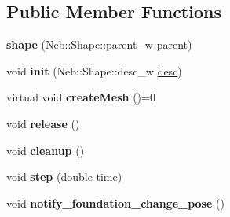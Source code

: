\subsection*{\-Public \-Member \-Functions}
\begin{DoxyCompactItemize}
\item 
\hypertarget{classNeb_1_1Shape_1_1shape_ad2547b328a70cdf62f5ad2b0331ccb1a}{{\bfseries shape} (\-Neb\-::\-Shape\-::parent\-\_\-w \hyperlink{classNeb_1_1Shape_1_1parent}{parent})}\label{classNeb_1_1Shape_1_1shape_ad2547b328a70cdf62f5ad2b0331ccb1a}

\item 
\hypertarget{classNeb_1_1Shape_1_1shape_af467bc3c9286f1d10114480c9d5d0db0}{void {\bfseries init} (\-Neb\-::\-Shape\-::desc\-\_\-w \hyperlink{classNeb_1_1Shape_1_1desc}{desc})}\label{classNeb_1_1Shape_1_1shape_af467bc3c9286f1d10114480c9d5d0db0}

\item 
\hypertarget{classNeb_1_1Shape_1_1shape_aa7a6106b9e5901d903b527b171cf8800}{virtual void {\bfseries create\-Mesh} ()=0}\label{classNeb_1_1Shape_1_1shape_aa7a6106b9e5901d903b527b171cf8800}

\item 
\hypertarget{classNeb_1_1Shape_1_1shape_ada83179ec6b4f3737a6e5ef2eb29564d}{void {\bfseries release} ()}\label{classNeb_1_1Shape_1_1shape_ada83179ec6b4f3737a6e5ef2eb29564d}

\item 
\hypertarget{classNeb_1_1Shape_1_1shape_a7ce08185aa4431ec2f39fef1e1933a7a}{void {\bfseries cleanup} ()}\label{classNeb_1_1Shape_1_1shape_a7ce08185aa4431ec2f39fef1e1933a7a}

\item 
\hypertarget{classNeb_1_1Shape_1_1shape_adb1a3c375e57fbf636182719f4f8f2a3}{void {\bfseries step} (double time)}\label{classNeb_1_1Shape_1_1shape_adb1a3c375e57fbf636182719f4f8f2a3}

\item 
\hypertarget{classNeb_1_1Shape_1_1shape_ac96d4dc310d2393672bf331a9b4eaad9}{void {\bfseries notify\-\_\-foundation\-\_\-change\-\_\-pose} ()}\label{classNeb_1_1Shape_1_1shape_ac96d4dc310d2393672bf331a9b4eaad9}

\end{DoxyCompactItemize}
